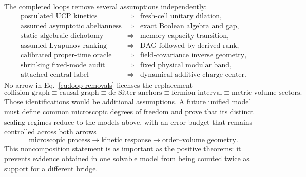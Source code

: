 The completed loops remove several assumptions independently:
\begin{equation}
\begin{array}{rcl}
\text{postulated UCP kinetics}
&\Longrightarrow&\text{fresh-cell unitary dilation},\\
\text{assumed asymptotic abelianness}
&\Longrightarrow&\text{exact Boolean algebra and gap},\\
\text{static algebraic dichotomy}
&\Longrightarrow&\text{memory-capacity transition},\\
\text{assumed Lyapunov ranking}
&\Longrightarrow&\text{DAG followed by derived rank},\\
\text{calibrated proper-time oracle}
&\Longrightarrow&\text{field-covariance inverse geometry},\\
\text{shrinking fixed-mode audit}
&\Longrightarrow&\text{fixed physical modular band},\\
\text{attached central label}
&\Longrightarrow&\text{dynamical additive-charge center}.
\end{array}
\label{eq:loop-removals}
\end{equation}
No arrow in Eq.~\eqref{eq:loop-removals} licenses the replacement
\[
\text{collision graph}\equiv\text{causal graph}\equiv
\text{de Sitter anchors}\equiv\text{fermion interval}\equiv
\text{metric-volume sectors}.
\]
Those identifications would be additional assumptions.  A future unified
model must define common microscopic degrees of freedom and prove that its
distinct scaling regimes reduce to the models above, with an error budget
that remains controlled across both arrows
\[
\text{microscopic process}\longrightarrow\text{kinetic response}
\longrightarrow\text{order--volume geometry}.
\]
This noncomposition statement is as important as the positive theorems: it
prevents evidence obtained in one solvable model from being counted twice as
support for a different bridge.
